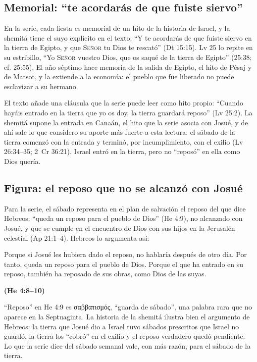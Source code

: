 \documentclass[11pt,letterpaper]{article}
\newcommand{\grc}[1]{\foreignlanguage{ancientgreek}{#1}}
\newcommand{\SENOR}{\textsc{Señor}}
\newcommand{\fuente}[1]{\par\hfill{\upshape\bfseries\small\textcolor{tierraroja}{#1}}}
\begin{document}
\subsection{Memorial: ``te acordarás de que fuiste siervo''}
En la serie, cada fiesta es memorial de un hito de la historia de Israel, y la shemitá tiene el suyo explícito en el texto: ``Y te acordarás de que fuiste siervo en la tierra de Egipto, y que \SENOR{} tu Dios te rescató'' (Dt 15:15). Lv 25 lo repite en su estribillo, ``Yo \SENOR{} vuestro Dios, que os saqué de la tierra de Egipto'' (25:38; cf. 25:55). El año séptimo hace memoria de la salida de Egipto, el hito de Pésaj y de Matsot, y la extiende a la economía: el pueblo que fue liberado no puede esclavizar a su hermano.

El texto añade una cláusula que la serie puede leer como hito propio: ``Cuando hayáis entrado en la tierra que yo os doy, la tierra guardará reposo'' (Lv 25:2). La shemitá supone la entrada en Canaán, el hito que la serie asocia con Josué, y de ahí sale lo que considero su aporte más fuerte a esta lectura: el sábado de la tierra comenzó con la entrada y terminó, por incumplimiento, con el exilio (Lv 26:34--35; 2~Cr 36:21). Israel entró en la tierra, pero no ``reposó'' en ella como Dios quería.

\subsection{Figura: el reposo que no se alcanzó con Josué}
Para la serie, el sábado representa en el plan de salvación el reposo del que dice Hebreos: ``queda un reposo para el pueblo de Dios'' (He 4:9), no alcanzado con Josué, y que se cumple en el encuentro de Dios con sus hijos en la Jerusalén celestial (Ap 21:1--4). Hebreos lo argumenta así:

\begin{cita}Porque si Josué les hubiera dado el reposo, no hablaría después de otro día. Por tanto, queda un reposo para el pueblo de Dios. Porque el que ha entrado en su reposo, también ha reposado de sus obras, como Dios de las suyas.\fuente{(He 4:8--10)}\end{cita}

``Reposo'' en He 4:9 es \grc{σαββατισμός}, ``guarda de sábado'', una palabra rara que no aparece en la Septuaginta. La historia de la shemitá ilustra bien el argumento de Hebreos: la tierra que Josué dio a Israel tuvo sábados prescritos que Israel no guardó, la tierra los ``cobró'' en el exilio y el reposo verdadero quedó pendiente. Lo que la serie dice del sábado semanal vale, con más razón, para el sábado de la tierra.
\end{document}
